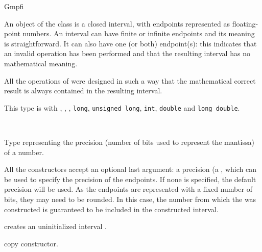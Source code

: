 \begin{ccRefClass} {Gmpfi}
\label{Gmpfi}

\ccDefinition

An object of the class  is a closed interval, with endpoints
represented as  floating-point numbers. An interval can have
finite or infinite endpoints and its meaning is straightforward. It can
also have one (or both)  endpoint(s): this indicates that an
invalid operation has been performed and that the resulting interval has no
mathematical meaning.

All the operations of  were designed in such a way that the
mathematical correct result is always contained in the resulting interval.

This type is  with , ,
, \verb-long-, \verb-unsigned long-, \verb-int-, \verb-double-
and \verb-long double-.


\ccIsModel
{}\\

\ccTypes

                {Type representing the precision (number of bits
                used to represent the mantissa) of a number.}

\ccCreation

All the constructors accept an optional last argument: a precision (a
, which can be used to specify the precision of the
 endpoints. If none is specified, the default precision will be
used. As the endpoints are represented with a fixed number of bits, they
may need to be rounded. In this case, the number from which the 
was constructed is guaranteed to be included in the constructed interval.


        {creates an uninitialized  interval \ccVar.}

\ccHidden {}
        {copy constructor.}



\end{ccRefClass}
